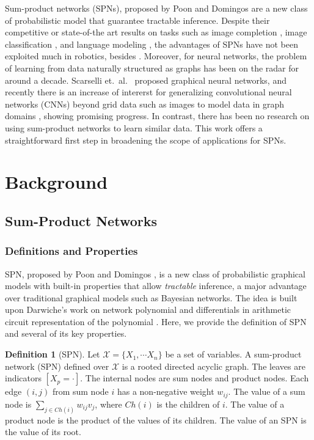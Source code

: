 \documentclass[11pt, titlepage]{article}
\theoremstyle{definition}
\newtheorem{definition}{Definition}[section]
\begin{document}
Sum-product networks (SPNs), proposed by Poon and Domingos \cite{poon2011sum} are a new class of probabilistic model that guarantee tractable inference. Despite their competitive or state-of-the art results on tasks such as image completion \cite{poon2011sum}, image classification \cite{gens2012discriminative}, and language modeling \cite{cheng2014language}, the advantages of SPNs have not been exploited much in robotics, besides \cite{pronobis2016learning}. Moreover, for neural networks, the problem of learning from data naturally structured as graphs has been on the radar for around a decade. Scarselli et.~al.~\cite{scarselli2009graph} proposed graphical neural networks, and recently there is an increase of intererst for generalizing convolutional neural networks (CNNs) beyond grid data such as images to model data in graph domains \cite{defferrard2016convolutional}\cite{kipf2016semi}, showing promising progress. In contrast, there has been no research on using sum-product networks to learn similar data. This work offers a straightforward first step in broadening the scope of applications for SPNs.




\section{Background}\label{section:background}

\subsection{Sum-Product Networks}\label{section:spn}

\subsubsection{Definitions and Properties}

SPN, proposed by Poon and Domingos \cite{poon2011sum}, is a new class of probabilistic graphical models with built-in properties that allow \textit{tractable} inference, a major advantage over traditional graphical models such as Bayesian networks. The idea is built upon Darwiche's work on network polynomial and differentials in arithmetic circuit representation of the polynomial \cite{darwiche2003differential}. Here, we provide the definition of SPN and several of its key properties.

\begin{definition}[SPN]
\cite{poon2011sum}
Let $\mathcal{X}=\{X_1,\cdots X_n\}$ be a set of variables. A sum-product network (SPN) defined over $\mathcal{X}$ is a rooted directed acyclic graph. The leaves are indicators $[X_p= \cdot ]$. The internal nodes are sum nodes and product nodes. Each edge $(i,j)$ from sum node $i$ has a non-negative weight $w_{ij}$. The value of a sum node is $\sum_{j\in Ch(i)}w_{ij}v_j$, where $Ch(i)$ is the children of $i$. The value of a product node is the product of the values of its children. The value of an SPN is the value of its root.
\end{definition}
\end{document}
